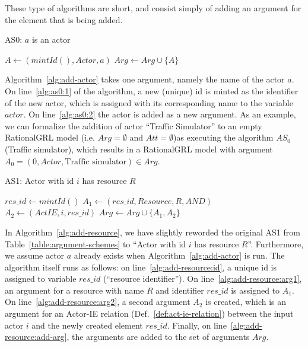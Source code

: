 These type of algorithms are short, and consist simply of adding an argument for the element that is being added. 

\begin{algorithm}[h]
  \caption{AS0: $a$ is an actor}\label{alg:add-actor}
  \begin{algorithmic}[1]
    \State $A \leftarrow (mintId(), Actor, a)$ \label{alg:as0:1}
    \State $Arg\leftarrow Arg \cup \{A\}$\label{alg:as0:2}
    \EndProcedure
  \end{algorithmic}
\end{algorithm}

Algorithm~\ref{alg:add-actor} takes one argument, namely the name of the actor $a$. On line~\ref{alg:as0:1} of the algorithm, a new (unique) id is minted as the identifier of the new actor, which is assigned with its corresponding name to the variable $actor$. On line~\ref{alg:as0:2} the actor is added as a new argument. As an example, we can formalize the addition of actor ``Traffic Simulator'' to an empty RationalGRL model (i.e. $Arg=\emptyset$ and $Att=\emptyset$)as executing the algorithm $AS_0$(Traffic simulator), which results in a RationalGRL model with argument $A_0 = (0, Actor, \text{Traffic simulator})\in Arg$.

\begin{algorithm}[h]
  \caption{AS1: Actor with id $i$ has resource $R$}\label{alg:add-resource}
  \begin{algorithmic}[1]
    \State $res\_id\gets mintId()$\label{alg:add-resource:id}
    \State $A_1\leftarrow (res\_id, Resource, R, AND)$\label{alg:add-resource:arg1}
    \State $A_2\leftarrow (ActIE, i, res\_id)$\label{alg:add-resource:arg2}
    \State $Arg\gets Arg\cup \{A_1,A_2\}$\label{alg:add-resource:add-arg}
    \EndProcedure
  \end{algorithmic}
\end{algorithm}

In Algorithm~\ref{alg:add-resource}, we have slightly reworded the original AS1 from Table~\ref{table:argument-schemes} to ``Actor with id $i$ has resource $R$''. Furthermore, we assume actor $a$ already exists when Algorithm~\ref{alg:add-actor} is run. The algorithm itself runs as follows: on line~\ref{alg:add-resource:id}, a unique id is assigned to variable $res\_id$ (``resource identifier''). On line~\ref{alg:add-resource:arg1}, an argument for a resource with name $R$ and identifier $res\_id$ is assigned to $A_1$. On line~\ref{alg:add-resource:arg2}, a second argument $A_2$ is created, which is an argument for an Actor-IE relation (Def.~\ref{def:act-ie-relation}) between the input actor $i$ and the newly created element $res\_id$. Finally, on line~\ref{alg:add-resource:add-arg}, the arguments are added to the set of arguments $Arg$.

